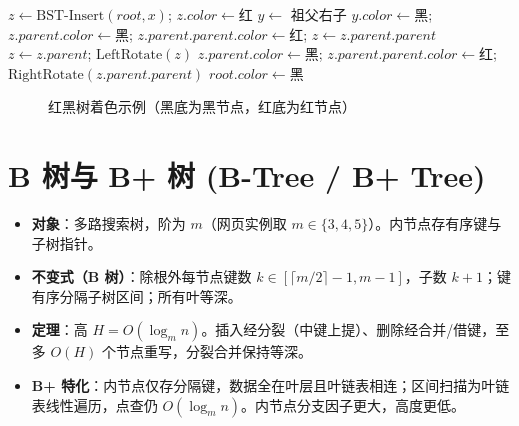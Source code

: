 \begin{algorithm}[H]
\caption{红黑树插入修复规约}
\begin{algorithmic}[1]
\State $z\gets\text{BST-Insert}(root,x)$; $z.color\gets\text{红}$
        \State $y\gets$ 祖父右子 
         $y.color\gets\text{黑}$; $z.parent.color\gets\text{黑}$; $z.parent.parent.color\gets\text{红}$; $z\gets z.parent.parent$
        \Else
             $z\gets z.parent$; $\text{LeftRotate}(z)$ \EndIf
            \State $z.parent.color\gets\text{黑}$; $z.parent.parent.color\gets\text{红}$; $\text{RightRotate}(z.parent.parent)$
        \EndIf
    \Else {} \EndIf
\EndWhile
\State $root.color\gets\text{黑}$
\end{algorithmic}
\end{algorithm}

\begin{figure}[H]
\centering
{}
\caption{红黑树着色示例（黑底为黑节点，红底为红节点）}
\label{fig:rb_coloring}
\end{figure}

\section{B 树与 B+ 树 (B-Tree / B+ Tree)}

\begin{itemize}
    \item \textbf{对象}：多路搜索树，阶为 $m$（网页实例取 $m \in \{3,4,5\}$）。内节点存有序键与子树指针。
    \item \textbf{不变式（B 树）}：除根外每节点键数 $k \in [\lceil m/2 \rceil - 1, m-1]$，子数 $k+1$；键有序分隔子树区间；所有叶等深。
    \item \textbf{定理}：高 $H = O(\log_m n)$。插入经分裂（中键上提）、删除经合并/借键，至多 $O(H)$ 个节点重写，分裂合并保持等深。
    \item \textbf{B+ 特化}：内节点仅存分隔键，数据全在叶层且叶链表相连；区间扫描为叶链表线性遍历，点查仍 $O(\log_m n)$。内节点分支因子更大，高度更低。
\end{itemize}

